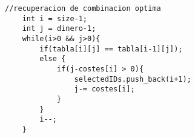 \begin{lstlisting}
//recuperacion de combinacion optima
    int i = size-1;
    int j = dinero-1;
    while(i>0 && j>0){
        if(tabla[i][j] == tabla[i-1][j]);
        else {
            if(j-costes[i] > 0){
                selectedIDs.push_back(i+1);
                j-= costes[i];
            }
        }
        i--;
    }
\end{lstlisting}
